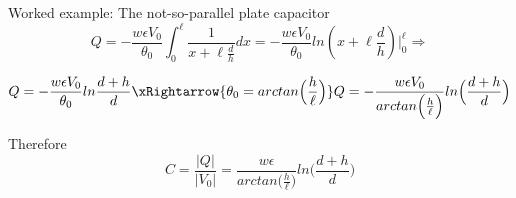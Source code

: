 {\begin{frame}{Worked example: The not-so-parallel plate capacitor}
  \begin{equation*}
    Q = -\frac{w \epsilon V_0}{\theta_0} \int_{0}^{\ell} \frac{1}{x + \ell \frac{d}{h}} dx =
        -\frac{w \epsilon V_0}{\theta_0} ln(x + \ell \frac{d}{h}) \Big\rvert_{0}^{\ell} \Rightarrow
  \end{equation*}

  \begin{equation*}
    Q = -\frac{w \epsilon V_0}{\theta_0} ln \frac{d + h}{d}
    \xRightarrow{\theta_0 = arctan\Big(\frac{h}{\ell}\Big)}
    Q = -\frac{w \epsilon V_0}{arctan\Big(\frac{h}{\ell}\Big)} ln \Big(\frac{d + h}{d}\Big)
  \end{equation*}

Therefore
  \begin{equation*}
    C = \frac{|Q|}{|V_0|} =
      \frac{w \epsilon}{arctan\Big(\frac{h}{\ell}\Big)} ln \Big(\frac{d + h}{d}\Big)
  \end{equation*}

\end{frame}


} %


%
%

